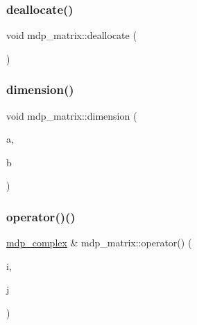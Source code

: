\subsubsection{\texorpdfstring{deallocate()}{deallocate()}}
{\footnotesize\ttfamily void mdp\+\_\+matrix\+::deallocate (\begin{DoxyParamCaption}{ }\end{DoxyParamCaption})\hspace{0.3cm}{\ttfamily [inline]}}

\mbox{\label{classmdp__matrix_a980d0f0a42bb19ba9135a0bf97d85c76}} 
\subsubsection{\texorpdfstring{dimension()}{dimension()}}
{\footnotesize\ttfamily void mdp\+\_\+matrix\+::dimension (\begin{DoxyParamCaption}\item[{const \hyperlink{mdp__global__vars_8h_a91ad9478d81a7aaf2593e8d9c3d06a14}{uint}}]{a,  }\item[{const \hyperlink{mdp__global__vars_8h_a91ad9478d81a7aaf2593e8d9c3d06a14}{uint}}]{b }\end{DoxyParamCaption})}

\mbox{\label{classmdp__matrix_a820c578eaf97324bec338827db42b8e6}} 
\subsubsection{\texorpdfstring{operator()()}{operator()()}\hspace{0.1cm}{\footnotesize\ttfamily [1/3]}}
{\footnotesize\ttfamily \hyperlink{classmdp__complex}{mdp\+\_\+complex} \& mdp\+\_\+matrix\+::operator() (\begin{DoxyParamCaption}\item[{const \hyperlink{mdp__global__vars_8h_a91ad9478d81a7aaf2593e8d9c3d06a14}{uint}}]{i,  }\item[{const \hyperlink{mdp__global__vars_8h_a91ad9478d81a7aaf2593e8d9c3d06a14}{uint}}]{j }\end{DoxyParamCaption})\hspace{0.3cm}{\ttfamily [inline]}}

